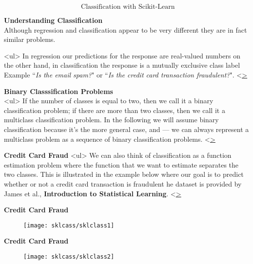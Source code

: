 \huge
\[ \mbox{ Classification with Scikit-Learn} \]

  

\textbf{Understanding Classification}\\
Although regression and classification appear to be very different they are in fact similar problems.

<ul>
 In regression our predictions for the response are real-valued numbers
 on the other hand, in classification the response is a mutually exclusive class label 
 Example ``\textit{Is the email spam?}" or ``\textit{Is the credit card transaction fraudulent?}".
<\ul>


  


 
 \textbf{Binary Classsification Problems}\\
 <ul>
 If the number of classes is equal to two, then we call it a binary classification problem; if there are more than two classes, then we call it a multiclass classification problem.
  In the following we will assume binary classification because it’s the more general case, and — we can always represent a multiclass problem as a sequence of binary classification problems.
<\ul>


  


\textbf{Credit Card Fraud}
<ul>
 We can also think of classification as a function estimation problem where the function that we want to estimate separates the two classes. 
 This is illustrated in the example below where our goal is to predict whether or not a credit card transaction is fraudulent
 he dataset is provided by James et al., \textbf{Introduction to Statistical Learning}.
<\ul>



  


\vspace{-1cm}
\textbf{Credit Card Fraud}
\begin{figure}
\centering
\texttt{[image: sklcass/sklclass1]}

\end{figure}


  


\textbf{Credit Card Fraud}
\begin{figure}
\centering
\texttt{[image: sklcass/sklclass2]}

\end{figure}



